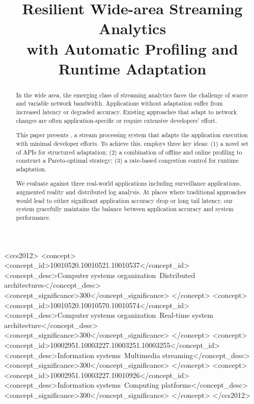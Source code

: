 \documentclass[sigplan, anonymous, review]{acmart}
\begin{document}
\title{Resilient Wide-area Streaming Analytics \\
  with Automatic Profiling and Runtime Adaptation}

\renewcommand{\shortauthors}{B. Zhang et al.}



\begin{abstract}
  In the wide area, the emerging class of streaming analytics faces the
  challenge of scarce and variable network bandwidth. Applications without
  adaptation suffer from increased latency or degraded accuracy. Existing
  approaches that adapt to network changes are often application-specific or
  require extensive developers' effort.

  This paper presents \sysname{}, a stream processing system that adapts the
  application execution with minimal developer efforts. To achieve this,
  \sysname{} employs three key ideas: (1) a novel set of APIs for structured
  adaptation; (2) a combination of offline and online profiling to construct a
  Pareto-optimal strategy; (3) a rate-based congestion control for runtime
  adaptation.

  We evaluate \sysname{} against three real-world applications including
  surveillance applications, augmented reality and distributed log analysis. At
  places where traditional approaches would lead to either significant
  application accuracy drop or long tail latency, our system gracefully
  maintains the balance between application accuracy and system performance.
\end{abstract}

%
\begin{CCSXML}
<ccs2012>
  <concept>
    <concept_id>10010520.10010521.10010537</concept_id>
    <concept_desc>Computer systems organization~Distributed architectures</concept_desc>
    <concept_significance>300</concept_significance>
  </concept>
  <concept>
    <concept_id>10010520.10010570.10010574</concept_id>
    <concept_desc>Computer systems organization~Real-time system architecture</concept_desc>
    <concept_significance>300</concept_significance>
  </concept>
  <concept>
    <concept_id>10002951.10003227.10003251.10003255</concept_id>
    <concept_desc>Information systems~Multimedia streaming</concept_desc>
    <concept_significance>300</concept_significance>
  </concept>
  <concept>
    <concept_id>10002951.10003227.10010926</concept_id>
    <concept_desc>Information systems~Computing platforms</concept_desc>
    <concept_significance>300</concept_significance>
  </concept>
</ccs2012>
\end{CCSXML}
\end{document}
